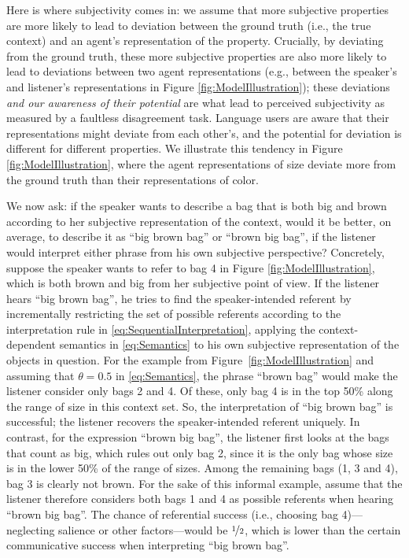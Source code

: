 \documentclass[10pt,a4paper]{article}
\begin{document}
Here is where subjectivity comes in: we assume that more subjective properties are more likely to lead to deviation between the ground truth (i.e., the true context) and an agent's representation of the property. Crucially, by deviating from the ground truth, these more subjective properties are also more likely to lead to deviations between two agent representations (e.g., between the speaker's and listener's representations in Figure \ref{fig:ModelIllustration}); these deviations \emph{and our awareness of their potential} are what lead to perceived subjectivity as measured by a faultless disagreement task. Language users are aware that their representations might deviate from each other's, and the potential for deviation is different for different properties. We illustrate this tendency in Figure \ref{fig:ModelIllustration}, where the agent representations of size deviate more from the ground truth than their representations of color.

We now ask: if the speaker wants to describe a bag that is both big and brown according to her subjective representation of the context, would it be better, on average, to describe it as ``big brown bag'' or ``brown big bag'', if the listener would interpret either phrase from his own subjective perspective? Concretely, suppose the speaker wants to refer to bag 4 in Figure \ref{fig:ModelIllustration}, which is both brown and big from her subjective point of view. If the listener hears ``big brown bag'', he tries to find the speaker-intended referent by incrementally restricting the set of possible referents according to the interpretation rule in \eqref{eq:SequentialInterpretation}, applying the context-dependent semantics in \eqref{eq:Semantics} to his own subjective representation of the objects in question. For the example from Figure~\ref{fig:ModelIllustration} and assuming that $\theta = 0.5$ in \eqref{eq:Semantics}, the phrase ``brown bag'' would make the listener consider only bags 2 and 4. Of these, only bag 4 is in the top 50\% along the range of size in this context set. So, the interpretation of ``big brown bag'' is successful; the listener recovers the speaker-intended referent uniquely. In contrast, for the expression ``brown big bag'', the listener first looks at the bags that count as big, which rules out only bag 2, since it is the only bag whose size is in the lower 50\% of the range of sizes. Among the remaining bags (1, 3 and 4), bag 3 is clearly not brown. For the sake of this informal example, assume that the listener therefore considers both bags 1 and 4 as possible referents when hearing ``brown big bag''. The chance of referential success (i.e., choosing bag 4)---neglecting salience or other factors---would be $\nicefrac{1}{2}$, which is lower than the certain communicative success when interpreting ``big brown bag''.
\end{document}
